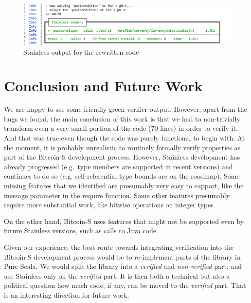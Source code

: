 \documentclass[hyphens, a4paper,USenglish,cleveref, autoref, thm-restate]{oasics-v2019}
\begin{document}
\begin{figure}
	\centering
		\includegraphics[width=\textwidth]{result_output}
	\caption{Stainless output for the rewritten code}
  \label{fig:result}
\end{figure}


\section{Conclusion and Future Work}

We are happy to see some friendly green verifier output. However,
apart from the bugs we found, the main conclusion of this work is that
we had to non-trivially transform even a very small portion of the
code (70 lines) in order to verify it. And that was true even though
the code was purely functional to begin with. At the moment, it is
probably unrealistic to routinely formally verify properties as part
of the Bitcoin-S development process. However, Stainless development
has already progressed (e.g.\ type members are supported in recent
versions) and continues to do so (e.g. self-referential type bounds
are on the roadmap). Some missing features that we identified are
presumably very easy to support, like the message parameter in the
require function. Some other features presumably require more
substantial work, like bitwise operations on integer types.

On the other hand, Bitcoin-S uses features that might not be supported
even by future Stainless versions, such as calls to Java code.

Given our experience, the best route towards integrating verification
into the Bitcoin-S development process would be to re-implement parts
of the library in Pure Scala. We would split the library into a
\emph{verified} and \emph{non-verified} part, and use Stainless only
on the \emph{verified} part. It is then both a technical but also a
political question how much code, if any, can be moved to the
\emph{verified} part. That is an interesting direction for future
work.

\appendix


\end{document}
